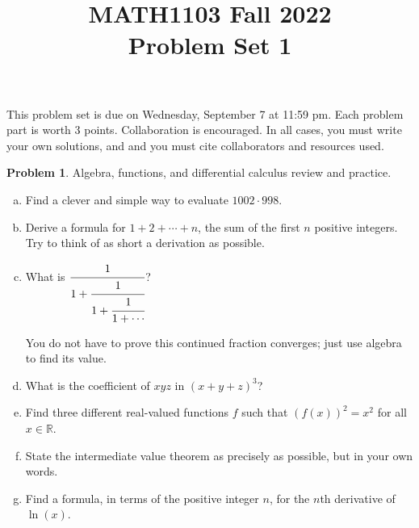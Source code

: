 \documentclass[11pt,oneside]{amsart}
\title{MATH1103 Fall 2022\\
Problem Set 1}
\theoremstyle{definition}
\newtheorem{problem}{Problem}
\newcommand{\bR}{\mathbb{R}}
\begin{document}
    \maketitle
    This problem set is due on Wednesday, September 7 at 11:59 pm. Each problem part is worth 3 points. Collaboration is encouraged. In all cases, you must write your own solutions, and and you must cite collaborators and resources used.

    \begin{problem}
        Algebra, functions, and differential calculus review and practice.
        \begin{enumerate}[(a)]
            \item Find a clever and simple way to evaluate $1002\cdot 998$.
            \item Derive a formula for $1+2+\cdots+n$, the sum of the first $n$ positive integers. Try to think of as short a derivation as possible.
            \item What is $\cfrac 1{1+\cfrac 1{1+\cfrac 1{1+\cdots}}}$?
            
            You do not have to prove this continued fraction converges; just use algebra to find its value.
            \item What is the coefficient of $xyz$ in $(x+y+z)^3$?
            
            \item Find three different real-valued functions $f$ such that $(f(x))^2=x^2$ for all $x\in\bR$.
            \item State the intermediate value theorem as precisely as possible, but in your own words.
            \item Find a formula, in terms of the positive integer $n$, for the $n$th derivative of $\ln(x)$.
        \end{enumerate}
    \end{problem}
\end{document}
